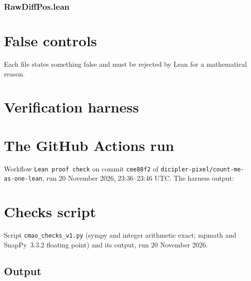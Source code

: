 \documentclass[11pt]{article}
\theoremstyle{definition}
\begin{document}
\subsubsection*{RawDiffPos.lean}
\section{False controls}
Each file states something false and must be rejected by Lean for a mathematical reason.
\section{Verification harness}
\section{The GitHub Actions run}\label{app:ci}
Workflow \texttt{Lean proof check} on commit \texttt{cee88f2} of \texttt{dicipler-pixel/count-me-as-one-lean}, run 20 November 2026, 23:36--23:46 UTC. The harness output:
\section{Checks script}\label{app:checks}
Script \texttt{cmao\_checks\_v1.py} (sympy and integer arithmetic exact; mpmath and SnapPy~3.3.2 floating point) and its output, run 20 November 2026.
\subsection*{Output}
\end{document}
